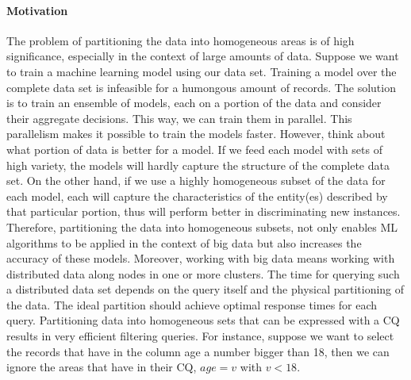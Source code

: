 \paragraph{Motivation}
The problem of partitioning the data into homogeneous areas is of high significance, especially in the context of large amounts of data. Suppose we want to train a machine learning model using our data set. Training a model over the complete data set is infeasible for a humongous amount of records. The solution is to train an ensemble of models, each on a portion of the data and consider their aggregate decisions. This way, we can train them in parallel. This parallelism makes it possible to train the models faster. However, think about what portion of data is better for a model. If we feed each model with sets of high variety, the models will hardly capture the structure of the complete data set. On the other hand, if we use a highly homogeneous subset of the data for each model, each will capture the characteristics of the entity(es) described by that particular portion, thus will perform better in discriminating new instances. Therefore, partitioning the data into homogeneous subsets, not only enables ML algorithms to be applied in the context of big data but also increases the accuracy of these models. Moreover, working with big data means working with distributed data along nodes in one or more clusters. The time for querying such a distributed data set depends on the query itself and the physical partitioning of the data. The ideal partition should achieve optimal response times for each query. Partitioning data into homogeneous sets that can be expressed with a CQ results in very efficient filtering queries. For instance, suppose we want to select the records that have in the column age a number bigger than 18, then we can ignore the areas that have in their CQ, $age = v$ with $v < 18$. 


